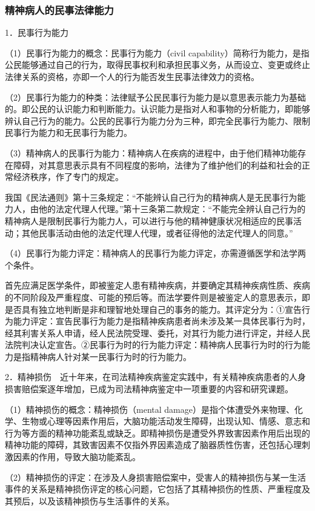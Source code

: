 \subsubsection{精神病人的民事法律能力}

1．民事行为能力

（1）民事行为能力的概念：民事行为能力（civil
capability）简称行为能力，是指公民能够通过自己的行为，取得民事权利和承担民事义务，从而设立、变更或终止法律关系的资格，亦即一个人的行为能否发生民事法律效力的资格。

（2）民事行为能力的种类：法律赋予公民民事行为能力是以意思表示能力为基础的。即公民的认识能力和判断能力。认识能力是指对人和事物的分析能力，即能够辨认自己行为的能力。公民的民事行为能力分为三种，即完全民事行为能力、限制民事行为能力和无民事行为能力。

（3）精神病人的民事行为能力：精神病人在疾病的进程中，由于他们精神功能存在障碍，对其意思表示具有不同程度的影响，法律为了维护他们的利益和社会的正常经济秩序，作了专门的规定。

我国《民法通则》第十三条规定：“不能辨认自己行为的精神病人是无民事行为能力人，由他的法定代理人代理。”第十三条第二款规定：“不能完全辨认自己行为的精神病人是限制民事行为能力人，可以进行与他的精神健康状况相适应的民事活动；其他民事活动由他的法定代理人代理，或者征得他的法定代理人的同意。”

（4）民事行为能力评定：精神病人的民事行为能力评定，亦需遵循医学和法学两个条件。

首先应满足医学条件，即被鉴定人患有精神疾病，并要确定其精神疾病性质、疾病的不同阶段及严重程度、可能的预后等。而法学要件则是被鉴定人的意思表示，即是否具有独立地判断是非和理智地处理自己的事务的能力。其评定分为：①宣告行为能力评定：宣告民事行为能力是指精神疾病患者尚未涉及某一具体民事行为时，经其利害关系人申请，经人民法院受理、委托，对其行为能力进行评定，并经人民法院判决认定宣告。②民事行为时的行为能力评定：精神病人民事行为时的行为能力是指精神病人针对某一民事行为时的行为能力。

2．精神损伤　近十年来，在司法精神疾病鉴定实践中，有关精神疾病患者的人身损害赔偿案逐年增加，已成为司法精神病鉴定中一项重要的内容和研究课题。

（1）精神损伤的概念：精神损伤（mental
damage）是指个体遭受外来物理、化学、生物或心理等因素作用后，大脑功能活动发生障碍，出现认知、情感、意志和行为等方面的精神功能紊乱或缺乏。即精神损伤是遭受外界致害因素作用后出现的精神功能的障碍，其致害因素不仅指外界因素造成了脑器质性伤害，还包括心理刺激因素的作用，导致大脑功能紊乱。

（2）精神损伤的评定：在涉及人身损害赔偿案中，受害人的精神损伤与某一生活事件的关系是精神损伤评定的核心问题，它包括了其精神损伤的性质、严重程度及其预后，以及该精神损伤与生活事件的关系。

